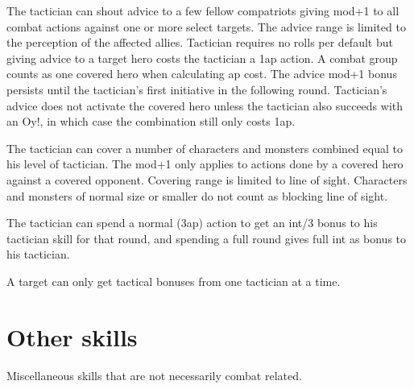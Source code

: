  The tactician can shout advice to a few fellow compatriots giving mod+1 to all combat actions against one or more select targets. The advice range is limited to the perception of the affected allies. Tactician requires no rolls per default but giving advice to a target hero costs the tactician a 1ap action. A combat group counts as one covered hero when calculating ap cost. The advice mod+1 bonus persists until the tactician's first initiative in the following round.
Tactician's advice does not activate the covered hero unless the tactician also succeeds with an Oy!, in which case the combination still only costs 1ap.

The tactician can cover a number of characters and monsters combined equal to his level of tactician. The mod+1 only applies to actions done by a covered hero against a covered opponent. Covering range is limited to line of sight. Characters and monsters of normal size or smaller do not count as blocking line of sight.

The tactician can spend a normal (3ap) action to get an int/3 bonus to his tactician skill for that round, and spending a full round gives full int as bonus to his tactician.

A target can only get tactical bonuses from one tactician at a time.




\closeskillslist
















\section*{Other skills}

Miscellaneous skills that are not necessarily combat related.



\openskillslist



